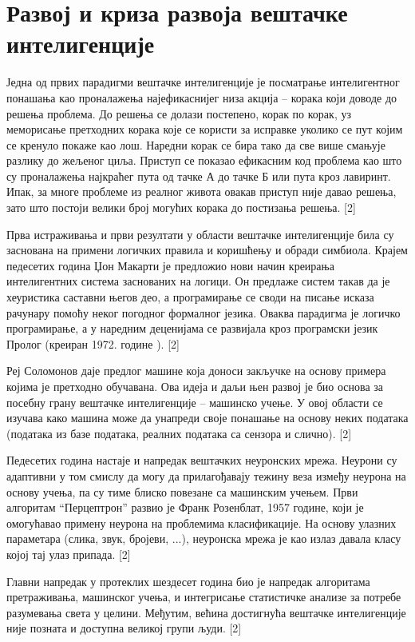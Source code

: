 \section*{Развој и криза развоја вештачке интелигенције}
Једна од првих парадигми вештачке интелигенције је посматрање интелигентног понашања као проналажења најефикаснијег низа акција – корака који доводе до решења проблема. До решења се долази постепено, корак по корак, уз меморисање претходних корака које се користи за исправке уколико се пут којим се кренуло покаже као лош. Наредни корак се бира тако да све више смањује разлику до жељеног циља. Приступ се показао ефикасним код проблема као што су проналажења најкраћег пута од тачке А до тачке Б или пута кроз лавиринт. Ипак, за многе проблеме из реалног живота овакав приступ није давао решења, зато што постоји велики број могућих корака до постизања решења. [2]

Прва истраживања и први резултати у области вештачке интелигенције била су заснована на примени логичких правила и коришћењу и обради симбиола. Крајем педесетих година Џон Макарти је предложио нови начин креирања интелигентних система заснованих на логици. Он предлаже систем такав да је хеуристика саставни његов део, а програмирање се своди на писање исказа рачунару помоћу неког погодног формалног језика. Оваква парадигма је логичко програмирање, а у наредним деценијама се развијала кроз програмски језик Пролог (креиран 1972. године ). [2]

Реј Соломонов даје предлог машине која доноси закључке на основу примера којима је претходно обучавана. Ова идеја и даљи њен развој је био основа за посебну грану вештачке интелигенције – машинско учење. У овој области се изучава како машина може да унапреди своје понашање на основу неких података (података из базе података, реалних података са сензора и слично). [2]

Педесетих година настаје и напредак вештачких неуронских мрежа. Неурони су адаптивни у том смислу да могу да прилагођавају тежину веза између неурона на основу учења, па су тиме блиско повезане са машинским учењем. Први алгоритам “Перцептрон” развио је Франк Розенблат, 1957 године, који је омогућавао примену неурона на проблемима класификације. На основу улазних параметара (слика, звук, бројеви, ...), неуронска мрежа је као излаз давала класу којој тај улаз припада. [2]

Главни напредак у протеклих шездесет година био је напредак алгоритама претраживања, машинског учења, и интегрисање статистичке анализе за потребе разумевања света у целини. Међутим, већина достигнућа вештачке интелигенције није позната и доступна великој групи људи. [2]

